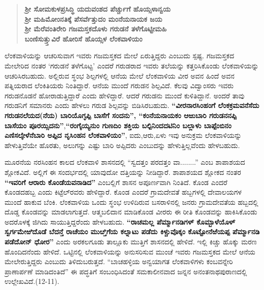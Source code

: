 \begin{verse}
\textbf{ಶ‍್ರೀ ಸೋಮಕುಳಪ್ರಸಿದ್ಧಿ ಯದುವಂಶದ ಪೆರ್ಚ್ಚುಗೆ ಹೊಯ್ಸಳಾನ್ವಯ} \\\textbf{ಶ‍್ರೀ ಮಹಿಮೋಂನತಿಕ್ಕೆ ಪೆಸರ್ವೆತ್ತುದಂ ಮಂನೆಯನಾಯಕ ಜಯ} \\\textbf{ಶ‍್ರೀ ಮೆರೆವಂತಿರೇರಿ ಗಜಮಸ್ತಕದೊಳು ಗರುಡನೆ ತಳೆಗೊಟ್ಟೀಮಹಿ} \\\textbf{ಬಂಣಿಸುತ್ತ್ತುವಿರೆ ಹೋರಿಸೆ ಹೊಯ್ಸಳ ಲೆಂಕವಾಳಿಯಂ}
\end{verse}

ಲೆಂಕವಾಳಿಯನ್ನು ಆಚರಿಸುವಾಗ ಇವರು ಗಜಮಸ್ತಕದ ಮೇಲೆ ಏರುತ್ತಿದ್ದರು ಎಂಬುದು ಸ್ಪಷ್ಟ. ಗಜಮಸ್ತಕದ ಮೇಲೇರಿದ ನಂತರ ‘ಗರುಡನೆ ತಳೆಗೊಟ್ಟ’ ಎಂದರೆ ಗರುಡರಾದ ಇವರು ತಲೆಯನ್ನು ಕತ್ತರಿಸಿಕೊಂಡು ಲೆಂಕವಾಳಿಯನ್ನು ಆಚರಿಸಿರಬಹುದು. ಅಲ್ಲಿರುವ ಸ್ಥಂಭ ಶಿಲ್ಪಗಳಲ್ಲಿ ಆನೆಯ ಮೇಲೆ ಲೆಂಕವಾಳಿಯ ವೀರ ಅವನ ಹಿಂದೆ ಅವನ ಪತ್ನಿಯರಾದ ಲೆಂಕಿತಿಯರು ನಿಂತಿದ್ದಾರೆ. ಆನೆಯ ಮುಂದೆ ಗರುಡನ ಶಿಲ್ಪವಿದೆ. ಕೆಲವು ವಿದ್ವಾಂಸರು ಇವರು ಗರುಡನೊಡನೆ ಹೋರಾಡುತ್ತಿದ್ದಾರೆ ಎಂದು ಹೇಳಿದ್ದಾರೆ. ಆದರೆ ಗರುಡನು ಮುಂದೆ ಕುಳಿತಿದ್ದಾನೆ. ಅಂದರೆ ತಾವು ಗರುಡನಿಗೆ ಸಮಾನರು ಎಂದು ಹೇಳಲು ಗರುಡ ಶಿಲ್ಪವನ್ನು ಬಿಡಿಸಿರಬಹುದು. \textbf{“ವೀರನಾರಸಿಂಹಂಗೆ ಲೆಂಕಕ್ರಮವನೆಸೆದು ಗರುಡ\-ನಲೆಯದ(ನೆಯ) ಬಾರಿಯೊಗ್ಳಪ್ಪಿ ಬಾಸೆಗೆ ಸಂದನು”, “ಕಂನೆಯನಾಯಕಂ ಆಱುಬಾರಿ ಗರುಡನನಪ್ಪಿ ಬಾಸೆಯಂ ಪೂರಯ್ಸಿದನು”},\textbf{“ರಂಗೈ\-ಯ್ಯನುಂ ಗುಣದಿಂ ಶಕ್ತಿಯ ಬಲ್ಪಿನಿಂದದಟಿನಿಂ ಬಲ್ಲಾಳು ಬಾಪ್ಪೆಂಬಿನಂ ಎಣಿಸಲ್ಕೇಳೆನೆಬಾರಿ ಅಪ್ಪಿದ ನೃಸಿಂಹನ ಲೆಂಕವಾಳಿಯಂ”}, ಐದು,ಆರು,ಏಳು ಇವು ಅನುಕ್ರಮ ಲೆಂಕವಾಳಿಯನ್ನು ಹೇಳುತ್ತಿವೆಯೇ ಹೊರತು, ಅಲುಗನ್ನು ಎಷ್ಟು ಬಾರಿ ಅಪ್ಪಿದರು ಎಂಬುದನ್ನು ಹೇಳುತ್ತಿಲ್ಲವೆಂದು ಹೇಳಬಹುದು.

ಮೂರನೆಯ ನರಸಿಂಹನ ಕಾಲದ ಲೆಂಕವಾಳಿ ಶಾಸನದಲ್ಲಿ “ಸ್ವದತ್ತಂ ಪರದತ್ತಂ ವಾ........” ಎಂಬ ಶಾಪಾಶಯದ ಶ್ಲೋಕವಿದೆ. ಅಲ್ಲಿಗೆ ಈ ಸಂದರ್ಭದಲ್ಲಿ ಯಾವುದೋ ದತ್ತಿಯನ್ನು ನೀಡಿದ್ದಾರೆ. ಶಾಪಾಶಯದ ಶ್ಲೋಕದ ನಂತರ \textbf{“ಇವರಿಗೆ ಆರಾರು ಕೊಂಡೆಯವನಾಡಿದ”} ಎಂಬಲ್ಲಿಗೆ ಶಾಸನ ಅಪೂರ್ಣವಾಗಿ ನಿಂತಿದೆ. ಕೊಂಡ ಎಂದರೆ ಕೊಂಡದಹಬ್ಬ ಎಂದು ಕಿಟ್ಟೆಲ್​ರವರು ಹೇಳಿದ್ದಾರೆ. ಕೊಂಡ ಎಂದರೆ ಗ್ರಾಮದೇವತೆ ಹಬ್ಬಗಳಲ್ಲಿ ದೇವಾಲಯಗಳ ಮುಂದೆ ಹಾಕುವ ಬೆಂಕಿ. ಲೆಂಕವಾಳಿಯ ಒಂದು ಸ್ಥಂಭ ಉಳಿದಿರುವ ಬಸರಾಳಿನಲ್ಲಿ ಜನರು ಗ್ರಾಮದೇವತೆಯ ಹಬ್ಬದಲ್ಲಿ ದೊಡ್ಡ ಕೊಂಡವನ್ನು ಮಾಡಲಾಗುತ್ತದೆ. ಆತ್ಮಬಲಿದಾನ ಮಾಡಿಕೊಂಡ ವೀರರು ಈ ರೀತಿ ಕೊಂಡವನ್ನು ಹಾಕಿಸಿಕೊಂಡು ಅದರೊಳಕ್ಕೆ ಜಿಗಿದು ಸಾಯುತ್ತಿದ್ದರೆಂದು ಹೇಳಬಹುದು. \textbf{“ರಾಚಮಲ್ಲ ಪೆರ್ಮ್ಮಾನಡಿಗಳ್​ ಕೊಮ್ಬಾಳೆಯೊಳ್​ ಸ್ವರ್ಗಮೇಱಿದೊಡೆ ಬೆದನ್ತೆ ರಾಚೆಯಂ ಮುೞ್ತಿಗೆಯ ಕಲ್ನಾಟು ಪಡೆದು ಕಿಳ್ಚುವೊಕ್ಕಂ ಕೊಟ್ಟೋನೆಱೆಯಪ್ಪ ಪೆರ್ಮ್ಮಾನಡಿ ಪಡೆದೋನ್​ ಧೋರ”} ಎಂದು ಅರಕಲಗೂಡು ತಾಲ್ಲೂಕು ಮುತ್ತಿಗೆ ಶಾಸನದಲ್ಲಿ ಹೇಳಿದೆ. ಇಲ್ಲಿ ಕಿಚ್ಚು ಹೊಕ್ಕು ಮರಣ ಹೊಂದಿದನೆಂದು ಹೇಳಿದೆ. ಒಟ್ಟಿನಲ್ಲಿ ಲೆಂಕವಾಳಿಯನ್ನು ಅನುಸರಿಸುವ ಮುಂಚೆ ಇವರು ಗಜಮಸ್ತಕದ ಮೇಲೆ ಆನೆಯ ಮೇಲೇರುತ್ತಿದ್ದರು ಎಂಬುದು ತಿಳಿದುಬರುತ್ತದೆ. “ಬಾಚಹಳ್ಳಿಯ ಅನ್ವಯಾಗತ ಲೆಂಕವಾಳಿಗಳು ಕಂಬವನ್ನೇರಿ ಪ್ರಾಣಾರ್ಪಣೆ ಮಾಡಿದಂತಿದೆ” ಈ ಪದ್ಧತಿಗೆ ಸಂಬಂಧಿಸಿದಂತೆ ಸಮಕಾಲೀನವಾದ ಜನ್ನನ ಅನಂತನಾಥಪುರಾಣದಲ್ಲಿ ಉಲ್ಲೇಖವಿದೆ.(12-11).

